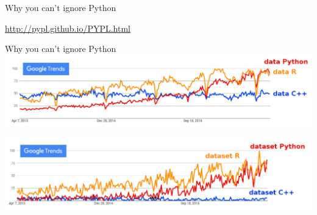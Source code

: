 \documentclass[aspectratio=169]{beamer}
\begin{document}
\begin{frame}{Why you can't ignore Python}
\vspace{0.25 cm}
\begin{center}
\end{center}
\textcolor{blue}{\scriptsize\url{http://pypl.github.io/PYPL.html}}
\end{frame}

\begin{frame}{Why you can't ignore Python}
\vspace{0.5 cm}
\includegraphics[width=\linewidth]{python-r-cpp-googletrends-data.png}

\vspace{1 cm}
\includegraphics[width=\linewidth]{python-r-cpp-googletrends-dataset.png}
\end{frame}
\end{document}
